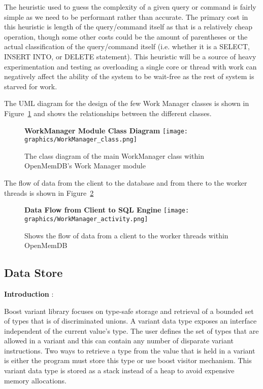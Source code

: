 \documentclass[letterpaper, 12pt]{article}
\begin{document}
  The heuristic used to guess the complexity of a given query or command is fairly simple as we need to
  be performant rather than accurate. The primary cost in this heuristic is length of the query/command itself
  as that is a relatively cheap operation, though some other costs could be the amount of parentheses
  or the actual classification of the query/command itself (i.e. whether it is a SELECT, INSERT INTO, or DELETE statement).
  This heuristic will be a source of heavy experimentation and testing as overloading a single core or thread
  with work can negatively affect the ability of the system to be wait-free as the rest of system is
  starved for work.
  \par\vspace{\baselineskip}
  The UML diagram for the design of the few Work Manager classes is shown in Figure~\ref{fig:work_manager_class}
  and shows the relationships between the different classes.
  
  \begin{figure}
   \centering
   \label{fig:work_manager_class}
   \textbf{WorkManager Module Class Diagram}
   \texttt{[image: graphics/WorkManager\_class.png]}
   \caption{The class diagram of the main WorkManager class within OpenMemDB's Work Manager module}
  \end{figure}

  The flow of data from the client to the database and from there to the worker threads
  is shown in Figure~\ref{fig:work_manager_activity}
  \begin{figure}
   \centering
   \label{fig:work_manager_activity}
   \textbf{Data Flow from Client to SQL Engine}
   \texttt{[image: graphics/WorkManager\_activity.png]}
   \caption{Shows the flow of data from a client to the worker threads within OpenMemDB}
  \end{figure}

\newpage
  \subsection{Data Store}
{\bfseries Introduction} :
\par\vspace{\baselineskip}
Boost variant library focuses on type-safe storage and retrieval of a bounded set of types that is
of discriminated unions. A variant data type exposes an interface independent of the current value's type. The user defines the set of types that are allowed in a variant and this can contain any number of disparate variant instructions. Two ways to retrieve a type from the value that is held in a variant is either the program must store this type or use boost visitor mechanism. This variant data type is stored as a stack instead of a heap to avoid expensive memory allocations.
\par\vspace{\baselineskip}
\end{document}
